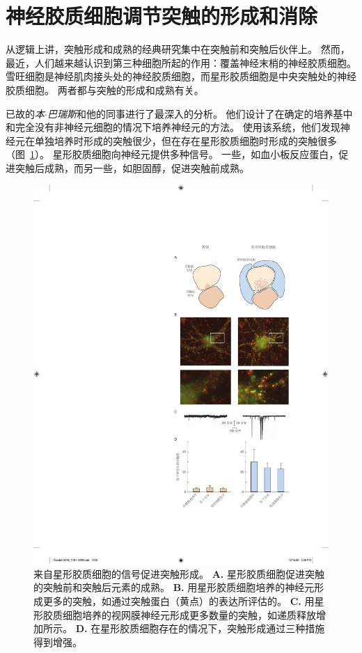 \section{神经胶质细胞调节突触的形成和消除}

从逻辑上讲，突触形成和成熟的经典研究集中在突触前和突触后伙伴上。
然而，最近，人们越来越认识到第三种细胞所起的作用：覆盖神经末梢的神经胶质细胞。
雪旺细胞是神经肌肉接头处的神经胶质细胞，而星形胶质细胞是中央突触处的神经胶质细胞。
两者都与突触的形成和成熟有关。


已故的\textit{本$\cdot$巴瑞斯}和他的同事进行了最深入的分析。
他们设计了在确定的培养基中和完全没有非神经元细胞的情况下培养神经元的方法。
使用该系统，他们发现神经元在单独培养时形成的突触很少，但在存在星形胶质细胞时形成的突触很多（图~\ref{fig:48_20}）。
星形胶质细胞向神经元提供多种信号。
一些，如血小板反应蛋白，促进突触后成熟，而另一些，如胆固醇，促进突触前成熟。


\begin{figure}[htbp]
	\centering
	\includegraphics[width=0.66\linewidth]{chap48/fig_48_20}
	\caption{来自星形胶质细胞的信号促进突触形成。
		\textbf{A.} 星形胶质细胞促进突触的突触前和突触后元素的成熟。
		\textbf{B.} 用星形胶质细胞培养的神经元形成更多的突触，如通过突触蛋白（黄点）的表达所评估的。
		\textbf{C.} 用星形胶质细胞培养的视网膜神经元形成更多数量的突触，如递质释放增加所示。
		\textbf{D.} 在星形胶质细胞存在的情况下，突触形成通过三种措施得到增强。}
	\label{fig:48_20}
\end{figure}


